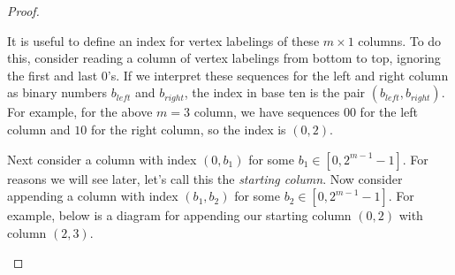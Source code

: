 \documentclass[12pt]{article}
\theoremstyle{plain}
\theoremstyle{definition}
\theoremstyle{remark}
\theoremstyle{definition}
\newcommand{\cell}[4]{ \draw[thick] ( #1 , #2 ) rectangle ( #3 , #4 );}
\newcommand{\lablnode}[3]{\node[shape=circle,draw=none,fill=none, inner sep=0pt,minimum size=5pt] (A) at ( #1 , #2 ) {#3};}
\newcommand{\lablvertex}[3]{\node[shape=circle,draw=none,fill=white, inner sep=2pt,minimum size=5pt] (A) at ( #1 , #2 ) {#3};}
\begin{document}
\begin{proof}
\begin{center}
\end{center}

It is useful to define an index for vertex labelings of these $m \times 1$ columns. To do this, consider reading a column of vertex labelings from bottom to top, ignoring the first and last $0$'s. If we interpret these sequences for the left and right column as binary numbers $b_{left}$ and $b_{right}$, the index in base ten is the pair $(b_{left}, b_{right})$. For example, for the above $m=3$ column, we have sequences $00$ for the left column and $10$ for the right column, so the index is $(0,2)$.

Next consider a column with index $(0, b_{1})$ for some $b_{1} \in [0,2^{m-1}-1]$. For reasons we will see later, let's call this the \textit{starting column}. Now consider appending a column with index $(b_{1}, b_{2})$ for some $b_{2} \in [0,2^{m-1}-1]$. For example, below is a diagram for appending our starting column $(0,2)$ with column $(2,3)$. 

\begin{center}
\end{center}
\end{proof}
\end{document}
